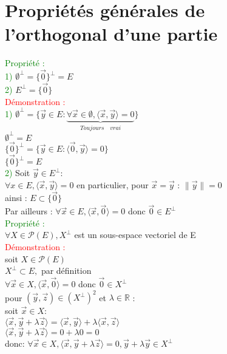 \documentclass{article}
\begin{document}
\section{Propriétés générales de l'orthogonal d'une partie}
\textcolor{green}{Propriété :} \\
\textcolor{green}{1)} $\emptyset^{\perp}= \lbrace \vec 0 \rbrace^{\perp}=E$ \\
\textcolor{green}{2)} $E^{\perp}= \lbrace \vec 0 \rbrace$ \\
\textcolor{red}{Démonstration :} \\
\textcolor{green}{1)} $\emptyset^{\perp}= \lbrace \vec y \in E : \underbrace{\forall \vec x \in \emptyset, \langle \vec x , \vec y \rangle = 0 }_{Toujours\quad vrai} \rbrace$ \\
$\emptyset^{\perp}=E$ \\
$\lbrace \vec 0 \rbrace^{\perp}= \lbrace \vec y \in E : \langle \vec 0, \vec y \rangle =0 \rbrace $ \\
$\lbrace \vec 0 \rbrace^{\perp}= E$ \\
\textcolor{green}{2)} Soit $\vec y \in E^{\perp} :$ \\
$\forall x \in E, \langle \vec x, \vec y  \rangle =0$ en particulier, pour $\vec x= \vec y$ : $\| \vec y \| = 0$ \\
ainsi : $E \subset \lbrace \vec 0 \rbrace$ \\
Par ailleurs : $\forall \vec x \in E, \langle \vec x ,\vec 0 \rangle =0$ donc $\vec 0 \in E^{\perp}$ \\
\textcolor{green}{Propriété :} \\
$\forall X \in \mathcal P (E), X^{\perp}$ est un sous-espace vectoriel de E \\
\textcolor{red}{Démonstration :} \\
soit $X \in \mathcal P(E)$ \\
$X^{\perp} \subset E,$ par définition \\
$\forall \vec x \in X, \langle \vec x ,\vec 0 \rangle = 0$ donc $\vec 0 \in X^{\perp}$ \\
pour $(\vec y, \vec z) \in (X^{\perp})^2$ et $\lambda \in \mathbb R$ : \\
soit $\vec x \in X :$ \\
$\langle \vec x , \vec y + \lambda \vec z \rangle = \langle \vec x, \vec y \rangle + \lambda \langle \vec x, \vec z \rangle$ \\
$\langle \vec x , \vec y + \lambda \vec z \rangle = 0 + \lambda 0=0$ \\
donc: $\forall \vec x \in X, \langle \vec x, \vec y + \lambda \vec z \rangle = 0, \vec y +\lambda \vec y \in X^{\perp}$ \\
\end{document}
